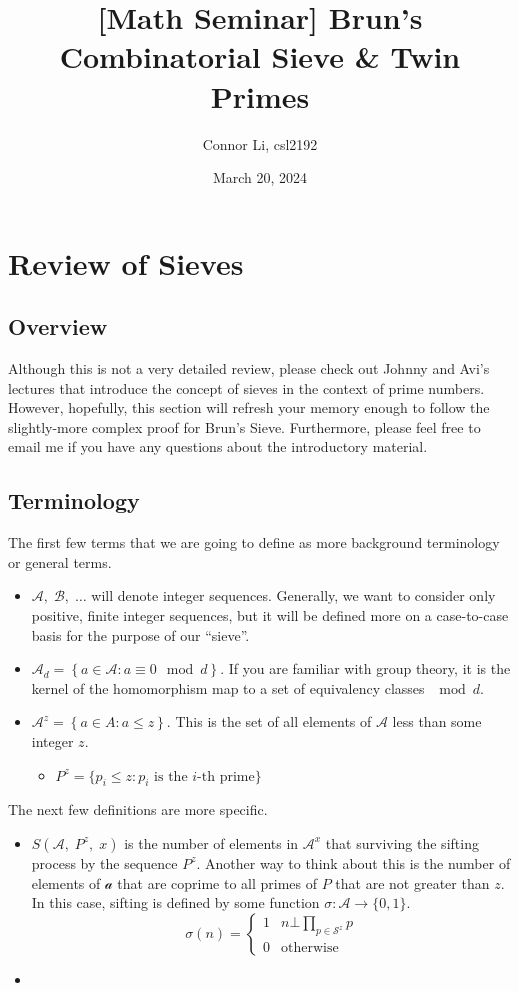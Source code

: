 \documentclass[8pt]{extarticle}
\title{[Math Seminar] Brun's Combinatorial Sieve \& Twin Primes}
\author{Connor Li, csl2192}
\date{March 20, 2024}
\begin{document}
\maketitle


\pagebreak
\section{Review of Sieves}
\subsection{Overview}
Although this is not a very detailed review, please check out Johnny and Avi's lectures that introduce the concept of sieves in the context of prime numbers. However, hopefully, this section will refresh your memory enough to follow the slightly-more complex proof for Brun's Sieve. Furthermore, please feel free to email me if you have any questions about the introductory material.
\subsection{Terminology}
The first few terms that we are going to define as more background terminology or general terms.
\begin{itemize}
    \item $\mathcal{A}, \;\mathcal{B},\; \dots$ will denote integer sequences. Generally, we want to consider only positive, finite integer sequences, but it will be defined more on a case-to-case basis for the purpose of our ``sieve''.
    \item $\mathcal{A}_d = \left\{a \in \mathcal{A} : a \equiv 0 \mod d\right\}$. If you are familiar with group theory, it is the kernel of the homomorphism map to a set of equivalency classes $\mod d$. 
    \item  $\mathcal{A}^z = \left\{a \in A : a \leq z\right\}$. This is the set of all elements of $\mathcal{A}$ less than some integer $z$. 
    \begin{itemize}
        \item $P^z = \{p_i \leq z : p_i \text{ is the }i\text{-th prime}\}$
    \end{itemize}
\end{itemize}
The next few definitions are more specific.
\begin{itemize}
    \item $S(\mathcal{A}, \;P^z,\;x)$ is the number of elements in $\mathcal{A}^x$ that surviving the sifting process by the sequence $P^z$. Another way to think about this is the number of elements of $\mathcal{a}$ that are coprime to all primes of $P$ that are not greater than $z$. In this case, sifting is defined by some function $\sigma: \mathcal{A} \rightarrow \{0,1\}$.
    $$
    \sigma(n) = \begin{cases}
        1 & n \bot \prod_{p \in \mathcal{S}^z} p\\
        0 & \text{otherwise}
    \end{cases}
    $$
    \item 
\end{itemize}
\end{document}
